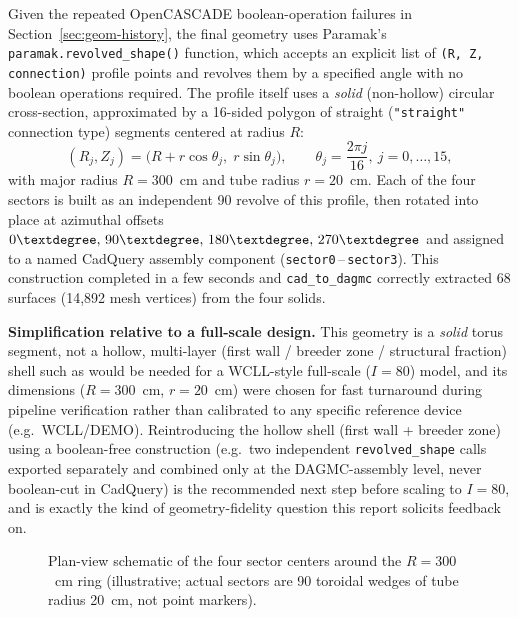 \documentclass[11pt]{article}
\begin{document}
Given the repeated OpenCASCADE boolean-operation failures in
Section~\ref{sec:geom-history}, the final geometry uses Paramak's
\texttt{paramak.revolved\_shape()} function, which accepts an explicit
list of \texttt{(R, Z, connection)} profile points and revolves them by a
specified angle with no boolean operations required. The profile itself
uses a \emph{solid} (non-hollow) circular cross-section, approximated by a
16-sided polygon of straight (\texttt{"straight"} connection type)
segments centered at radius $R$:
\[
(R_j, Z_j) = \bigl(R + r\cos\theta_j,\; r\sin\theta_j\bigr), \qquad
\theta_j = \frac{2\pi j}{16},\ j=0,\dots,15,
\]
with major radius $R=300$~cm and tube radius $r=20$~cm. Each of the four
sectors is built as an independent 90\textdegree{} revolve of this profile,
then rotated into place at azimuthal offsets $0\textdegree,\,90\textdegree,\,180\textdegree,\,270\textdegree$
and assigned to a named CadQuery assembly component
(\texttt{sector0}\,--\,\texttt{sector3}). This construction completed in a few
seconds and \texttt{cad\_to\_dagmc} correctly extracted 68 surfaces
(14{,}892 mesh vertices) from the four solids.

\textbf{Simplification relative to a full-scale design.} This geometry
is a \emph{solid} torus segment, not a hollow, multi-layer (first
wall / breeder zone / structural fraction) shell such as would be needed
for a WCLL-style full-scale ($I=80$) model, and its dimensions ($R=300$~cm,
$r=20$~cm) were chosen for fast turnaround during pipeline verification
rather than calibrated to any specific reference device (e.g.\ WCLL/DEMO).
Reintroducing the hollow shell (first wall + breeder zone) using a
boolean-free construction (e.g.\ two independent \texttt{revolved\_shape}
calls exported separately and combined only at the DAGMC-assembly level,
never boolean-cut in CadQuery) is the recommended next step before scaling
to $I=80$, and is exactly the kind of geometry-fidelity question this
report solicits feedback on.

\begin{figure}[h]
\centering
{}
\caption{Plan-view schematic of the four sector centers around the $R=300$~cm ring (illustrative; actual sectors are 90\textdegree{} toroidal wedges of tube radius 20~cm, not point markers).}
\end{figure}
\end{document}
